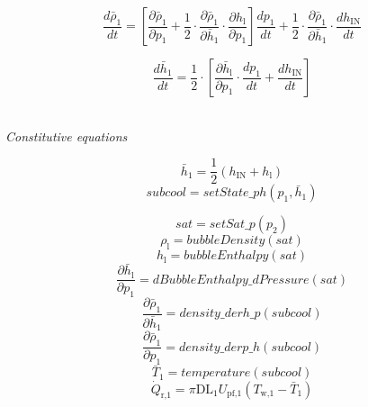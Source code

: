 \documentclass[11pt]{article} %
\begin{document}
\begin{equation}
\frac{d \bar{\rho}_\text{1}}{d t} = [ \frac{\partial \bar{\rho}_\text{1}}{\partial p_\text{1}} + \frac{1}{2} \cdot \frac{\partial \bar{\rho}_\text{1}}{\partial \bar{h}_\text{1}} \cdot \frac{\partial h_\text{l}}{\partial p_\text{1}}] \frac{d p_\text{1}}{d t} + \frac{1}{2} \cdot \frac{\partial \bar{\rho}_\text{1}}{\partial \bar{h}_\text{1}}  \cdot \frac{d h_\text{IN}}{d t}
\end{equation}


\begin{equation}
\frac{d \bar{h}_\text{1}}{d t} = \frac{1}{2} \cdot [\frac{\partial \bar{h}_\text{l}}{\partial p_\text{1}} \cdot \frac{d p_\text{1}}{d t} + \frac{d h_\text{IN}}{d t}]
\end{equation}
\\
\begin{center}
\textit{Constitutive equations}\\
\end{center}

\begin{equation}
\bar{h}_\text{1} =  \frac{1}{2}(h_\text{IN} + {h}_\text{l})
\end{equation}
\begin{equation}
subcool = setState\_ph(p_\text{1},\bar{h}_\text{1})
\end{equation}

\begin{equation}
sat = setSat\_p(p_\text{2})
\end{equation}
\begin{equation}
\rho_\text{l} = bubbleDensity(sat)
\end{equation}
\begin{equation}
h_\text{l} = bubbleEnthalpy(sat)
\end{equation}
\begin{equation}
\frac{\partial \bar{h}_\text{l}}{\partial p_\text{1}}= dBubbleEnthalpy\_dPressure(sat)
\end{equation}
\begin{equation}
\frac{\partial \bar{\rho}_\text{1}}{\partial \bar{h}_\text{1}}= density\_derh\_p(subcool)
\end{equation}
\begin{equation}
\frac{\partial \bar{\rho}_\text{1}}{\partial p_\text{1}}= density\_derp\_h(subcool)
\end{equation}
\begin{equation}
\bar{T}_\text{1} = temperature(subcool)
\end{equation}
\begin{equation}
\dot{Q}_\text{r,1} = \pi \text{D} \text{L}_\text{1} U_\text{pf,1} (T_\text{w,1} - \bar{T}_\text{1})
\end{equation}
\end{document}
